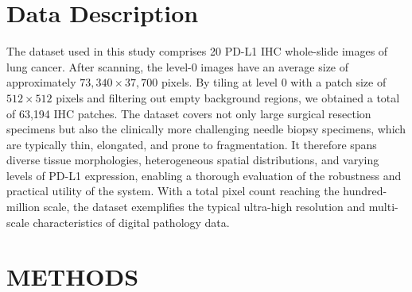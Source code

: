 \documentclass[journal]{vgtc}                     %
\begin{document}
\section{Data Description}

The dataset used in this study comprises 20 PD-L1 IHC whole-slide images of lung cancer. After scanning, the level-0 images have an average size of approximately $73{,}340 \times 37{,}700$ pixels. By tiling at level 0 with a patch size of $512 \times 512$ pixels and filtering out empty background regions, we obtained a total of 63{,}194 IHC patches. The dataset covers not only large surgical resection specimens but also the clinically more challenging needle biopsy specimens, which are typically thin, elongated, and prone to fragmentation. It therefore spans diverse tissue morphologies, heterogeneous spatial distributions, and varying levels of PD-L1 expression, enabling a thorough evaluation of the robustness and practical utility of the system. With a total pixel count reaching the hundred-million scale, the dataset exemplifies the typical ultra-high resolution and multi-scale characteristics of digital pathology data.


\section{METHODS}
\end{document}
